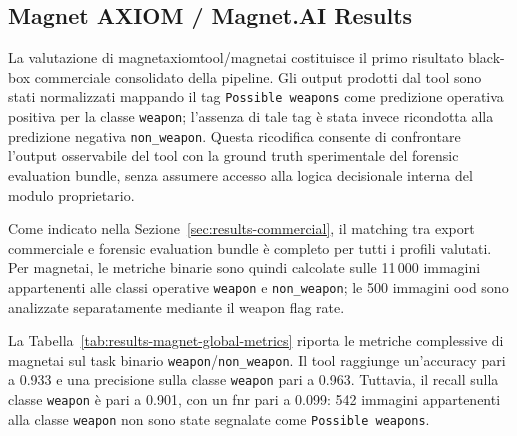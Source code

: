 \subsection{Magnet AXIOM / Magnet.AI Results}
\label{subsec:results-magnet}

La valutazione di \gls{magnetaxiomtool}/\gls{magnetai} costituisce il primo
risultato black-box commerciale consolidato della pipeline. Gli output prodotti
dal tool sono stati normalizzati mappando il tag \texttt{Possible weapons} come
predizione operativa positiva per la classe \texttt{weapon}; l'assenza di tale
tag è stata invece ricondotta alla predizione negativa
\texttt{non\_weapon}. Questa ricodifica consente di confrontare l'output
osservabile del tool con la ground truth sperimentale del forensic evaluation
bundle, senza assumere accesso alla logica decisionale interna del modulo
proprietario.

Come indicato nella Sezione~\ref{sec:results-commercial}, il matching tra
export commerciale e forensic evaluation bundle è completo per tutti i profili
valutati. Per \gls{magnetai}, le metriche binarie sono quindi calcolate sulle
11\,000 immagini appartenenti alle classi operative \texttt{weapon} e
\texttt{non\_weapon}; le 500 immagini \gls{ood} sono analizzate separatamente
mediante il weapon flag rate.

La Tabella~\ref{tab:results-magnet-global-metrics} riporta le metriche
complessive di \gls{magnetai} sul task binario
\texttt{weapon}/\texttt{non\_weapon}. Il tool raggiunge un'accuracy pari a
0.933 e una precisione sulla classe \texttt{weapon} pari a 0.963. Tuttavia, il
recall sulla classe \texttt{weapon} è pari a 0.901, con un \gls{fnr} pari a
0.099: 542 immagini appartenenti alla classe \texttt{weapon} non sono state
segnalate come \texttt{Possible weapons}.

